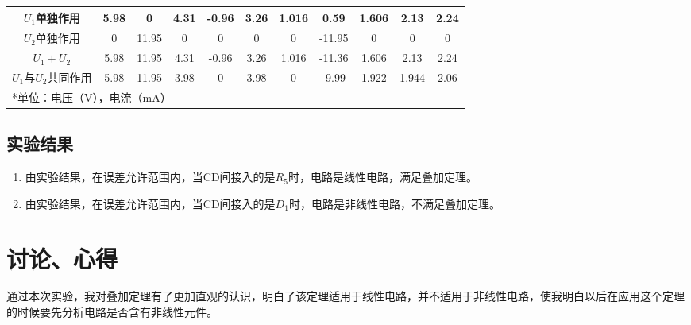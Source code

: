 \documentclass{../source/Experiment}
\begin{document}
\begin{enumerate}
\begin{table}[htbp]
\begin{center}
\begin{tabular}{|c|c|c|c|c|c|c|c|c|c|c|}
                            $U_1$单独作用       & 5.98  & 0     & 4.31  & -0.96 & 3.26  & 1.016    & 0.59     & 1.606    & 2.13     & 2.24     \\ \hline
                            $U_2$单独作用       & 0     & 11.95 & 0     & 0     & 0     & 0        & -11.95   & 0        & 0        & 0        \\ \hline
                            $U_1 + U_2$     & 5.98  & 11.95 & 4.31  & -0.96 & 3.26  & 1.016    & -11.36   & 1.606    & 2.13     & 2.24     \\ \hline
                            $U_1$与$U_2$共同作用 & 5.98  & 11.95 & 3.98  & 0     & 3.98  & 0        & -9.99    & 1.922    & 1.944    & 2.06     \\ \hline
                            \multicolumn{11}{l}{*单位：电压（V），电流（mA）}                                                                         
                        \end{tabular}
                    \end{center}
                \end{table}
            \end{enumerate}
        \subsection{实验结果}
            \begin{enumerate}
                \item 由实验结果，在误差允许范围内，当CD间接入的是$R_5$时，电路是线性电路，满足叠加定理。
                \item 由实验结果，在误差允许范围内，当CD间接入的是$D_1$时，电路是非线性电路，不满足叠加定理。
            \end{enumerate}
    \section{讨论、心得}
            通过本次实验，我对叠加定理有了更加直观的认识，明白了该定理适用于线性电路，并不适用于非线性电路，使我明白以后在应用这个定理的时候要先分析电路是否含有非线性元件。
\end{document}
